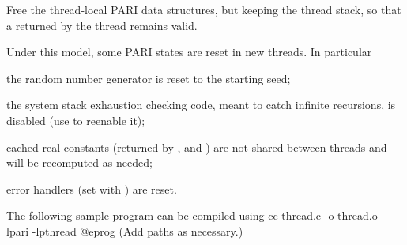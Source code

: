 Free the thread-local PARI data structures, but keeping the thread stack, so
that a  returned by the thread remains valid.

\noindent Under this model, some PARI states are reset in new threads. In
particular

\item the random number generator is reset to the starting seed;

\item the system stack exhaustion checking code, meant to catch infinite
recursions, is disabled (use  to reenable it);

\item cached real constants (returned by ,  and
) are not shared between threads and will be recomputed as
needed;

\item error handlers (set with ) are reset.

\noindent The following sample program can be compiled using
\bprog
    cc thread.c -o thread.o -lpari -lpthread
@eprog\noindent
(Add  paths as necessary.)

\noindent{}

\vfill\eject
